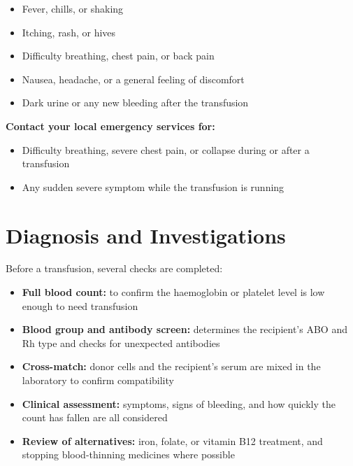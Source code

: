 \begin{itemize}
    \item Fever, chills, or shaking
    \item Itching, rash, or hives
    \item Difficulty breathing, chest pain, or back pain
    \item Nausea, headache, or a general feeling of discomfort
    \item Dark urine or any new bleeding after the transfusion
\end{itemize}

\textbf{Contact your local emergency services for:}
\begin{itemize}
    \item Difficulty breathing, severe chest pain, or collapse during or after a transfusion
    \item Any sudden severe symptom while the transfusion is running
\end{itemize}

\section*{Diagnosis and Investigations}
Before a transfusion, several checks are completed:

\begin{itemize}
    \item \textbf{Full blood count:} to confirm the haemoglobin or platelet level is low enough to need transfusion
    \item \textbf{Blood group and antibody screen:} determines the recipient's ABO and Rh type and checks for unexpected antibodies
    \item \textbf{Cross-match:} donor cells and the recipient's serum are mixed in the laboratory to confirm compatibility
    \item \textbf{Clinical assessment:} symptoms, signs of bleeding, and how quickly the count has fallen are all considered
    \item \textbf{Review of alternatives:} iron, folate, or vitamin B12 treatment, and stopping blood-thinning medicines where possible
\end{itemize}

